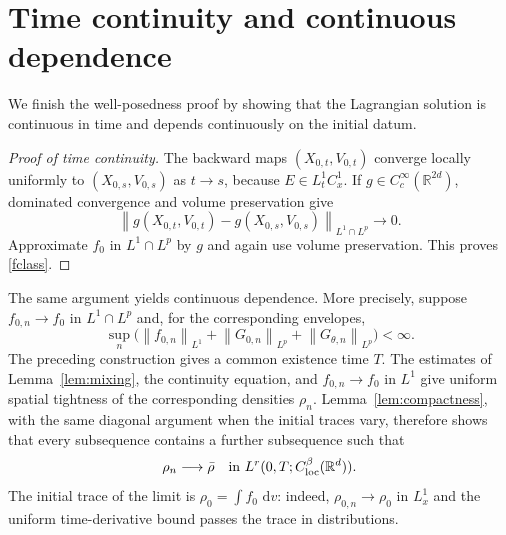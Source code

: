 \documentclass[11pt]{article}
\newcommand{\R}{\mathbb R}
\newcommand{\norm}[1]{\left\lVert #1\right\rVert}
\newcommand{\dd}{\,\mathrm d}
\begin{document}
\section{Time continuity and continuous dependence}\label{sec:continuity}

We finish the well-posedness proof by showing that the Lagrangian solution is
continuous in time and depends continuously on the initial datum.

\begin{proof}[Proof of time continuity]
The backward maps $(X_{0,t},V_{0,t})$ converge locally uniformly to
$(X_{0,s},V_{0,s})$ as $t\to s$, because
$E\in L^1_tC^1_x$.  If $g\in C_c^\infty(\R^{2d})$, dominated convergence
and volume preservation give
\begin{equation*}
 \norm{g(X_{0,t},V_{0,t})-g(X_{0,s},V_{0,s})}_{L^1\cap L^p}\to0.
\end{equation*}
Approximate $f_0$ in $L^1\cap L^p$ by $g$ and again use volume preservation.
This proves \eqref{fclass}.
\end{proof}

The same argument yields continuous dependence.  More precisely, suppose
$f_{0,n}\to f_0$ in $L^1\cap L^p$ and, for the corresponding envelopes,
 \begin{equation*}
 \sup_n\bigl(\norm{f_{0,n}}_{L^1}+\norm{G_{0,n}}_{L^p}
                    +\norm{G_{\theta,n}}_{L^p}\bigr)<\infty.
\end{equation*} 
The preceding construction gives a common existence time  $T$.  The estimates
of Lemma~\ref{lem:mixing}, the continuity equation, and
$f_{0,n}\to f_0$ in $L^1$ give uniform spatial tightness of the corresponding
densities $\rho_n$.  Lemma~\ref{lem:compactness}, with the same diagonal
argument when the initial traces vary, therefore shows  that every subsequence
contains a further subsequence  such that
\begin{equation}\label{continuous-dependence-density}
 \rho_n\longrightarrow\bar\rho
 \quad\hbox{in }L^r(0,T;C^\beta_{\rm loc}(\R^d)).
\end{equation}
The initial trace of the limit is $\rho_0=\int f_0\,\dd v$: indeed,
$\rho_{0,n}\to\rho_0$ in $L^1_x$ and the uniform time-derivative bound passes
the trace in distributions.
\end{document}
